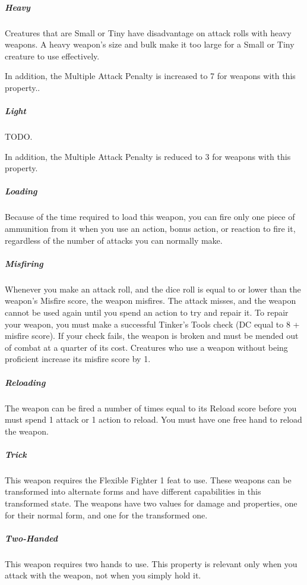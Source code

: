 
    \subparagraph{Heavy} Creatures that are Small or Tiny have disadvantage on attack rolls with heavy weapons.
    A heavy weapon's size and bulk make it too large for a Small or Tiny creature to use effectively.

    In addition, the Multiple Attack Penalty is increased to 7 for weapons with this property..

    \subparagraph{Light} TODO.

    In addition, the Multiple Attack Penalty is reduced to 3 for weapons with this property.

    \subparagraph{Loading} Because of the time required to load this weapon, you can fire only one piece of ammunition from it when you use an action, bonus action, or reaction to fire it, regardless of the number of attacks you can normally make.

    \subparagraph{Misfiring} Whenever you make an attack roll, and the dice roll is equal to or lower than the weapon’s Misfire score, the weapon misfires.
    The attack misses, and the weapon cannot be used again until you spend an action to try and repair it.
    To repair your weapon, you must make a successful Tinker’s Tools check (DC equal to 8 + misfire score).
    If your check fails, the weapon is broken and must be mended out of combat at a quarter of its cost.
    Creatures who use a weapon without being proficient increase its misfire score by 1.

    \subparagraph{Reloading} The weapon can be fired a number of times equal to its Reload score before you must spend 1 attack or 1 action to reload.
    You must have one free hand to reload the weapon.

    \subparagraph{Trick} This weapon requires the Flexible Fighter 1 feat to use.
    These weapons can be transformed into alternate forms and have different capabilities in this transformed state.
    The weapons have two values for damage and properties, one for their normal form, and one for the transformed one.

    \subparagraph{Two-Handed} This weapon requires two hands to use.
    This property is relevant only when you attack with the weapon, not when you simply hold it.

